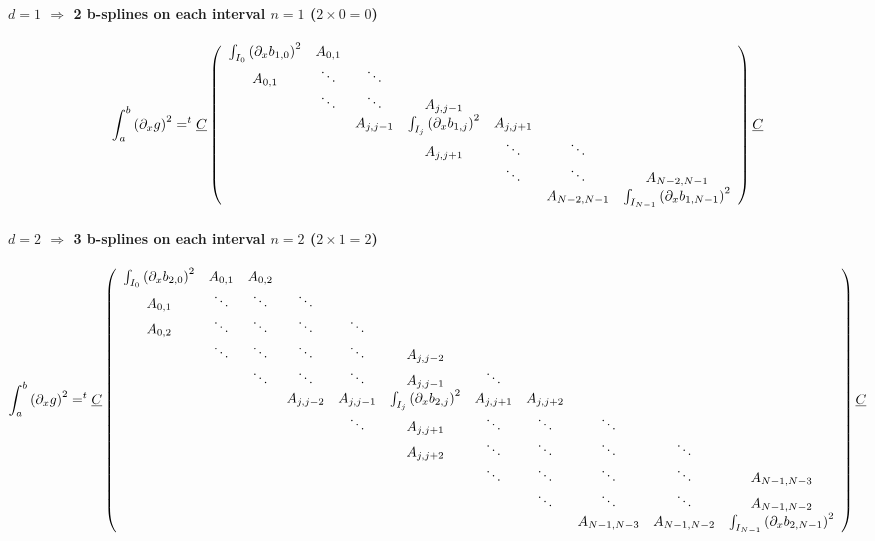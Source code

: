 \documentclass[paper=a4, fontsize=11pt]{book}
\numberwithin{equation}{section}		%
\numberwithin{figure}{section}			%
\numberwithin{table}{section}				%
\begin{document}
\begin{landscape}
\paragraph{\textbf{$d=1$ $\Rightarrow$ 2 b-splines on each interval $n=1$ ($2\times0=0$)}}
$$
\int_{a}^{b} \left(\partial_x g\right)^2 = ^t\underline{C} \left(\begin{array}{ccccccc}
\int_{I_0}\left(\partial_xb_{1,0}\right)^2&A_{0,1}&&&&&\\ A_{0,1}&\ddots&\ddots&&&&\\
&\ddots&\ddots&A_{j,j-1}&&&\\ &&A_{j,j-1}&\int_{I_j}\left(\partial_xb_{1,j}\right)^2&A_{j,j+1}&&\\ &&&A_{j,j+1}&\ddots&\ddots&\\
&&&&\ddots&\ddots&A_{N-2,N-1}\\ &&&&&A_{N-2,N-1}&\int_{I_{N-1}}\left(\partial_xb_{1,N-1}\right)^2
\end{array}\right) \underline{C}\\
$$

\paragraph{\textbf{$d=2$ $\Rightarrow$ 3 b-splines on each interval $n=2$ ($2\times1=2$)}}
$$
\int_{a}^{b} \left(\partial_xg\right)^2 = ^t\underline{C} \left(\begin{array}{ccccccccccc}
\int_{I_0}\left(\partial_xb_{2,0}\right)^2&A_{0,1}&A_{0,2}&&&&&&&&\\ A_{0,1}&\ddots&\ddots&\ddots&&&&&&&\\ A_{0,2}&\ddots&\ddots&\ddots&\ddots&&&&&&\\
&\ddots&\ddots&\ddots&\ddots&A_{j,j-2}&&&&&\\ &&\ddots&\ddots&\ddots&A_{j,j-1}&\ddots&&&&\\
&&&A_{j,j-2}&A_{j,j-1}&\int_{I_j}\left(\partial_xb_{2,j}\right)^2&A_{j,j+1}&A_{j,j+2}&&&\\
&&&&\ddots&A_{j,j+1}&\ddots&\ddots&\ddots&&\\ &&&&&A_{j,j+2}&\ddots&\ddots&\ddots&\ddots&\\
&&&&&&\ddots&\ddots&\ddots&\ddots&A_{N-1,N-3}\\ &&&&&&&\ddots&\ddots&\ddots&A_{N-1,N-2}\\ &&&&&&&&A_{N-1,N-3}&A_{N-1,N-2}&\int_{I_{N-1}}\left(\partial_xb_{2,N-1}\right)^2
\end{array}\right) \underline{C}\\
$$


\end{landscape}
\end{document}
